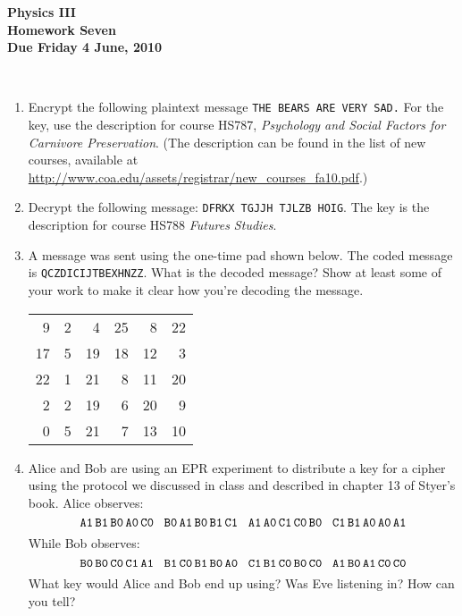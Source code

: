 \documentclass[12pt]{article}
\begin{document}
\pagestyle{empty}
 
\begin{center}
{\large {\bf Physics III}}\\
\medskip
{\large {\bf Homework Seven}}\\
\medskip
{ {\bf Due Friday 4 June, 2010}}\\
\end{center}

\hspace{2mm}\\


\begin{enumerate}
\setlength{\itemsep}{2mm}

\item Encrypt the following plaintext message {\tt THE BEARS ARE VERY
  SAD.}  For the key, use the description for course HS787, {\it
  Psychology and Social Factors for Carnivore Preservation}.   (The
  description can be found in the list of new courses, available at
  \url{http://www.coa.edu/assets/registrar/new_courses_fa10.pdf}.)

\item Decrypt the following message:  {\tt DFRKX TGJJH TJLZB HOIG}.
  The key is the description for course HS788 {\it Futures Studies}.  

\item A message was sent using the one-time pad shown below.  The
  coded message is {\tt QCZDICIJTBEXHNZZ}.  What is the decoded
  message?  Show at least some of your work to make it clear how
  you're decoding the message. 

{\large

\begin{center}
\begin{tabular}{ r r r r r r  }
9 & 2 & 4 & 25 & 8 & 22 \\
17 & 5 & 19 & 18 & 12 & 3 \\
22 & 1 & 21 & 8 & 11 & 20 \\
2 & 2 & 19 & 6 & 20 & 9 \\
0 & 5 & 21 & 7 & 13 & 10\\
\end{tabular}
\end{center}
}


\item Alice and Bob are using an EPR experiment to distribute a key
  for a cipher using the protocol we discussed in class and described
  in chapter 13 of Styer's book.  Alice
  observes:
\begin{equation}
  {\tt A1\,B1\,B0\,A0\,C0} \;\;\; {\tt B0\,A1\,B0\,B1\,C1} \;\;\; 
  {\tt A1\,A0\,C1\,C0\,B0} \;\;\; {\tt C1\,B1\,A0\,A0\,A1}
\end{equation}
While Bob observes:
\begin{equation}
  {\tt B0\,B0\,C0\,C1\,A1} \;\;\; {\tt B1\,C0\,B1\,B0\,A0} \;\;\; 
  {\tt C1\,B1\,C0\,B0\,C0} \;\;\; {\tt A1\,B0\,A1\,C0\,C0}
\end{equation}
What key would Alice and Bob end up using?  Was Eve listening in?  How
can you tell? 








\end{enumerate}
\end{document}
